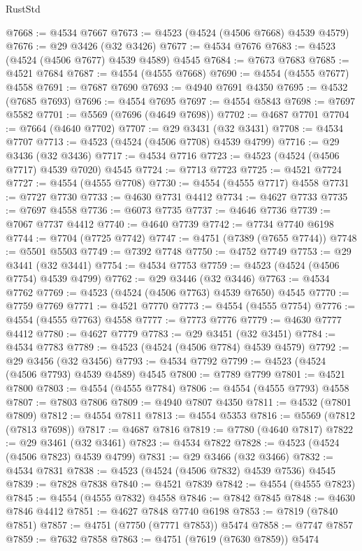 \begin{lexlean}{RustStd}
\begin{coremodule}
@7668 := @4534 @7667
@7673 := @4523 (@4524 (@4506 @7668) @4539 @4579)
@7676 := @29 @3426 (@32 @3426)
@7677 := @4534 @7676
@7683 := @4523 (@4524 (@4506 @7677) @4539 @4589) @4545
@7684 := @7673 @7683
@7685 := @4521 @7684
@7687 := @4554 (@4555 @7668)
@7690 := @4554 (@4555 @7677) @4558
@7691 := @7687 @7690
@7693 := @4940 @7691 @4350
@7695 := @4532 (@7685 @7693)
@7696 := @4554 @7695
@7697 := @4554 @5843
@7698 := @7697 @5582
@7701 := @5569 (@7696 (@4649 @7698))
@7702 := @4687 @7701
@7704 := @7664 (@4640 @7702)
@7707 := @29 @3431 (@32 @3431)
@7708 := @4534 @7707
@7713 := @4523 (@4524 (@4506 @7708) @4539 @4799)
@7716 := @29 @3436 (@32 @3436)
@7717 := @4534 @7716
@7723 := @4523 (@4524 (@4506 @7717) @4539 @7020) @4545
@7724 := @7713 @7723
@7725 := @4521 @7724
@7727 := @4554 (@4555 @7708)
@7730 := @4554 (@4555 @7717) @4558
@7731 := @7727 @7730
@7733 := @4630 @7731 @4412
@7734 := @4627 @7733
@7735 := @7697 @4558
@7736 := @6073 @7735
@7737 := @4646 @7736
@7739 := @7067 @7737 @4412
@7740 := @4640 @7739
@7742 := @7734 @7740 @6198
@7744 := @7704 (@7725 @7742)
@7747 := @4751 (@7389 (@7655 @7744))
@7748 := @5501 @5503
@7749 := @7392 @7748
@7750 := @4752 @7749
@7753 := @29 @3441 (@32 @3441)
@7754 := @4534 @7753
@7759 := @4523 (@4524 (@4506 @7754) @4539 @4799)
@7762 := @29 @3446 (@32 @3446)
@7763 := @4534 @7762
@7769 := @4523 (@4524 (@4506 @7763) @4539 @7650) @4545
@7770 := @7759 @7769
@7771 := @4521 @7770
@7773 := @4554 (@4555 @7754)
@7776 := @4554 (@4555 @7763) @4558
@7777 := @7773 @7776
@7779 := @4630 @7777 @4412
@7780 := @4627 @7779
@7783 := @29 @3451 (@32 @3451)
@7784 := @4534 @7783
@7789 := @4523 (@4524 (@4506 @7784) @4539 @4579)
@7792 := @29 @3456 (@32 @3456)
@7793 := @4534 @7792
@7799 := @4523 (@4524 (@4506 @7793) @4539 @4589) @4545
@7800 := @7789 @7799
@7801 := @4521 @7800
@7803 := @4554 (@4555 @7784)
@7806 := @4554 (@4555 @7793) @4558
@7807 := @7803 @7806
@7809 := @4940 @7807 @4350
@7811 := @4532 (@7801 @7809)
@7812 := @4554 @7811
@7813 := @4554 @5353
@7816 := @5569 (@7812 (@7813 @7698))
@7817 := @4687 @7816
@7819 := @7780 (@4640 @7817)
@7822 := @29 @3461 (@32 @3461)
@7823 := @4534 @7822
@7828 := @4523 (@4524 (@4506 @7823) @4539 @4799)
@7831 := @29 @3466 (@32 @3466)
@7832 := @4534 @7831
@7838 := @4523 (@4524 (@4506 @7832) @4539 @7536) @4545
@7839 := @7828 @7838
@7840 := @4521 @7839
@7842 := @4554 (@4555 @7823)
@7845 := @4554 (@4555 @7832) @4558
@7846 := @7842 @7845
@7848 := @4630 @7846 @4412
@7851 := @4627 @7848 @7740 @6198
@7853 := @7819 (@7840 @7851)
@7857 := @4751 (@7750 (@7771 @7853)) @5474
@7858 := @7747 @7857
@7859 := @7632 @7858
@7863 := @4751 (@7619 (@7630 @7859)) @5474

\end{coremodule}
\end{lexlean}
